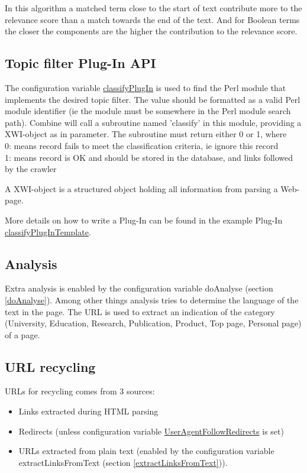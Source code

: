 In this algorithm a matched term close to the start of text contribute
more to the relevance score than a match towards the end of the
text. And for Boolean terms the closer the components are the higher
the contribution to the relevance score.

\subsection{Topic filter Plug-In API}
The configuration variable \hyperref{classifyPlugIn}{classifyPlugIn (section }{)}{classifyPlugIn} is used to find
the Perl module that implements the desired topic filter.
The value should be formatted as a valid Perl module identifier (ie
the module must be somewhere in the Perl module search path).
Combine will call a subroutine named 'classify' in this module,
providing a XWI-object as in parameter. The subroutine must
return either 0 or 1, where\\
0: means record fails to meet the classification criteria, ie ignore this record\\
1: means record is OK and should be stored in the database, and links followed by the crawler

A XWI-object is a structured object holding all information from
parsing a Web-page.

More details on how to write a Plug-In can be found in the example
Plug-In \hyperref{classifyPlugInTemplate.pm}{classifyPlugInTemplate.pm (see Appendix }{)}{classifyPlugInTemplate}.

\subsection{Analysis}
Extra analysis is enabled by the configuration variable 
doAnalyse (section \ref{doAnalyse}). Among other things analysis tries to determine 
the language of the text in the page. The URL is used to extract an
indication of the category (University, Education, Research,
Publication, Product, Top page, Personal
page) of a page.

\subsection{URL recycling}
URLs for recycling comes from 3 sources:
\begin{itemize}
\item Links extracted during HTML parsing
\item Redirects (unless configuration variable \hyperref{UserAgentFollowRedirects}{UserAgentFollowRedirects (section }{)}{UserAgentFollowRedirects} is set)
\item URLs extracted from plain text (enabled by the configuration variable
extractLinksFromText (section \ref{extractLinksFromText})).
\end{itemize}

